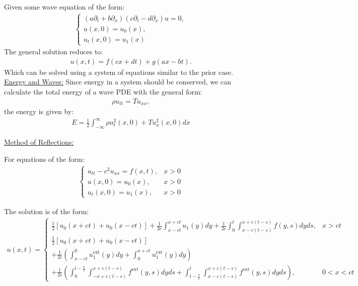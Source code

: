\documentclass{article}
\newcommand{\sheader}[1]{\underline{#1:}}
\newcommand{\gap}{\medskip\\}
\begin{document}
Given some wave equation of the form:
\begin{align*}
    \begin{cases}
        (a\partial_t + b\partial_x)(c\partial_t - d\partial_x) u = 0,\\
        u(x, 0) = u_0(x),\\
        u_t(x, 0) = u_1(x)
    \end{cases}
\end{align*}
The general solution reduces to:
\begin{align*}
    u(x, t) = f(cx + dt) + g(ax - bt).
\end{align*}
Which can be solved using a system of equations similar to the prior case.
\gap
\sheader{Energy and Waves}
Since energy in a system should be conserved, we can calculate the total 
energy of a wave PDE with the general form:
\begin{align*}
    \rho u_{tt} = Tu_{xx},
\end{align*}
the energy is given by:
\begin{align*}
    E = \frac{1}{2} \int_{-\infty}^{\infty} \rho u_t^2(x, 0) + Tu_x^2(x, 0) dx
\end{align*}

\sheader{Method of Reflections}

For equations of the form:
\begin{align*}
    \begin{cases}
        u_{tt} - c^2 u_{xx} = f(x, t), & x > 0\\
        u(x, 0) = u_0(x), & x > 0\\
        u_t(x, 0) = u_1(x), & x > 0
    \end{cases}
\end{align*}

The solution is of the form:
\begin{align*} u(x, t) = 
    \begin{cases}
        \frac{1}{2}\left[u_0(x +ct) + u_0(x-ct)\right] + \frac{1}{2c}\int_{x-ct}^{x+ct}u_1(y)dy
        + \frac{1}{2c}\int_{0}^{t}\int_{x-c(t-s)}^{x+c(t-s)} f(y, s)dyds, & x > ct\\
        \frac{1}{2}\left[u_0(x +ct) + u_0(x-ct)\right] \\ + \frac{1}{2c}\left(\int_{x-ct}^{0}u_1^{\textrm{ext}}(y)dy + \int_{0}^{x+ct}u_1^{\textrm{ext}}(y)dy\right)
        \\+ \frac{1}{2c}\left(\int_{0}^{t - \frac{x}{c}}\int_{-x+c(t-s)}^{x+c(t-s)} f^{\textrm{ext}}(y, s)dyds + \int_{t-\frac{x}{c}}^{t}\int_{x-c(t-s)}^{x+c(t-s)} f^{\textrm{ext}}(y, s)dyds \right), & 0 < x < ct
    \end{cases}
\end{align*}
\end{document}
